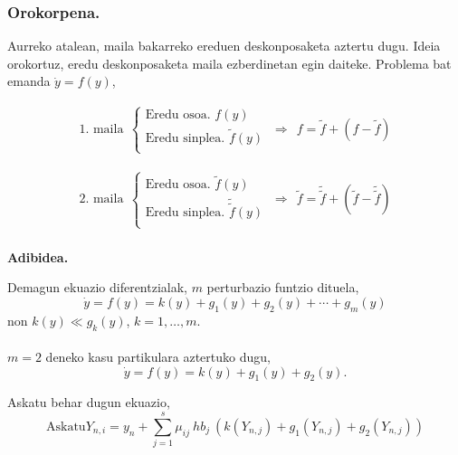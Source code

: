 \subsubsection*{Orokorpena.}

Aurreko atalean, maila bakarreko ereduen deskonposaketa aztertu dugu. Ideia orokortuz, eredu deskonposaketa maila ezberdinetan egin daiteke. Problema bat emanda $\dot{y} =f(y)$, 

\begin{align}
\mbox{1. maila} \ \
\left \{ \begin{array}{c}
  \mbox{Eredu osoa.   } f(y) \\[.25cm]
  \mbox{Eredu sinplea.    } \tilde{f}(y)  \\
\end{array} \right.
\ \Rightarrow \ \
f =\tilde{f}+(f-\tilde{f})  
\end{align}

\begin{align}
\mbox{2. maila} \ \
\left \{ \begin{array}{c}
  \mbox{Eredu osoa.   }\tilde{f}(y) \\[.25cm]
  \mbox{Eredu sinplea.    }\tilde{\tilde{f}}(y)  \\
\end{array} \right.
\ \Rightarrow \ \
\tilde{f} =\tilde{\tilde{f}}+({\tilde{f}}-\tilde{\tilde{f}})  
\end{align}

\paragraph*{} \textbf{Adibidea.}

Demagun ekuazio diferentzialak, $m$ perturbazio funtzio dituela,
\begin{equation*}
\dot{y}=f(y)=k(y)+g_1(y)+g_2(y)+\cdots+g_m(y)
\end{equation*}
non $k(y)\ll g_k(y)$,  $k=1,\dots,m$.

\paragraph*{}$m=2$ deneko kasu partikulara aztertuko dugu,
\begin{equation*}
\dot{y}=f(y)=k(y)+g_1(y)+g_2(y).
\end{equation*} 

Askatu behar dugun ekuazio,
\begin{equation*}
\mbox{Askatu} Y_{n,i}=y_{n}+ \sum\limits_{j=1}^{s} \mu_{ij} \ hb_j \ (k(Y_{n,j})+g_1(Y_{n,j})+g_2(Y_{n,j})) 
\end{equation*}


